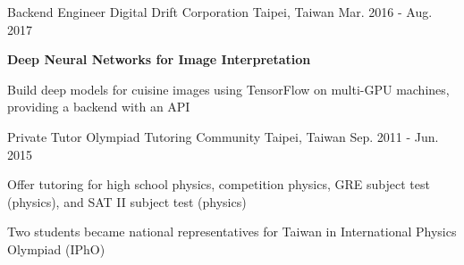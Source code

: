 \documentclass[12pt, a4paper]{awesome-cv}
\begin{document}
\newpage

\begin{cventries}
    \cventry
    {Backend Engineer}
    {Digital Drift Corporation}
    {Taipei, Taiwan}
    {Mar. 2016 - Aug. 2017}
    {
        \begin{cvitems}
        \item{\bfseries Deep Neural Networks for Image Interpretation}
            \begin{cvitems}
            \item{Build deep models for cuisine images using TensorFlow on multi-GPU machines, providing a backend with an API}
            \end{cvitems}
        \end{cvitems}
    }

    \cventry
    {Private Tutor}
    {Olympiad Tutoring Community}
    {Taipei, Taiwan}
    {Sep. 2011 - Jun. 2015}
    {
        \begin{cvitems}
        \item{Offer tutoring for high school physics, competition physics, GRE subject test (physics), and SAT II subject test (physics)}
        \item{Two students became national representatives for Taiwan in International Physics Olympiad (IPhO)}
        \end{cvitems}
    }
\end{cventries}
\end{document}
